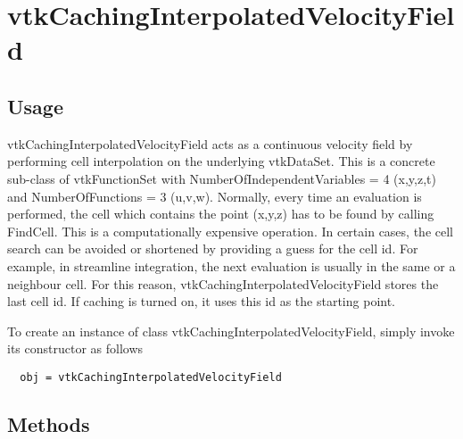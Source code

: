 \section{vtkCachingInterpolatedVelocityField}

\subsection{Usage}

 vtkCachingInterpolatedVelocityField acts as a continuous velocity field
 by performing cell interpolation on the underlying vtkDataSet.
 This is a concrete sub-class of vtkFunctionSet with 
 NumberOfIndependentVariables = 4 (x,y,z,t) and 
 NumberOfFunctions = 3 (u,v,w). Normally, every time an evaluation
 is performed, the cell which contains the point (x,y,z) has to
 be found by calling FindCell. This is a computationally expensive 
 operation. In certain cases, the cell search can be avoided or shortened 
 by providing a guess for the cell id. For example, in streamline
 integration, the next evaluation is usually in the same or a neighbour
 cell. For this reason, vtkCachingInterpolatedVelocityField stores the last
 cell id. If caching is turned on, it uses this id as the starting point.

To create an instance of class vtkCachingInterpolatedVelocityField, simply
invoke its constructor as follows
\begin{verbatim}
  obj = vtkCachingInterpolatedVelocityField
\end{verbatim}
\subsection{Methods}

